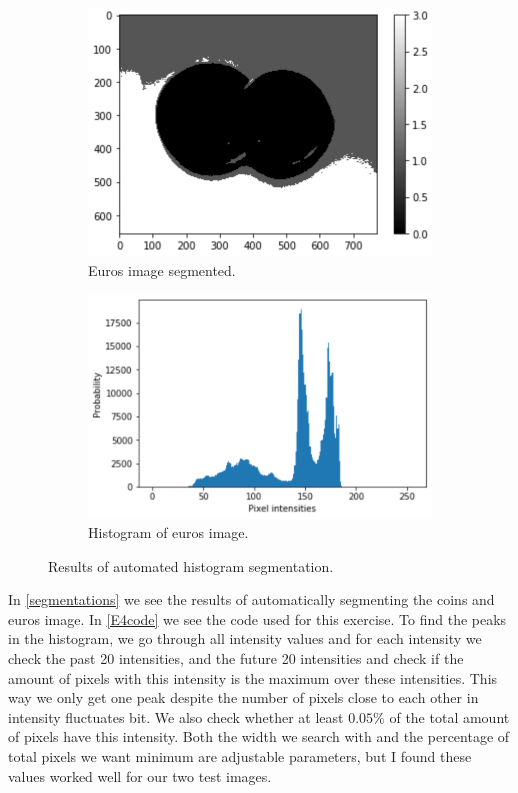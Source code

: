 \begin{figure}[H]
\begin{subfigure}[b]{0.45\linewidth}
		\includegraphics[width=\linewidth]{Materials/E4/euros_seg}
		\caption{Euros image segmented.}
	\end{subfigure}
	\hfill
	\begin{subfigure}[b]{0.45\linewidth}
		\centering
		\includegraphics[width=\linewidth]{Materials/E4/euros_hist}
		\caption{Histogram of euros image.}
	\end{subfigure}
	\caption{Results of automated histogram segmentation.}
	\label{segmentations}
\end{figure}
In \autoref{segmentations} we see the results of automatically segmenting the coins and euros image. In \autoref{E4code} we see the code used for this exercise. To find the peaks in the histogram, we go through all intensity values and for each intensity we check the past 20 intensities, and the future 20 intensities and check if the amount of pixels with this intensity is the maximum over these intensities. This way we only get one peak despite the number of pixels close to each other in intensity fluctuates bit. We also check whether at least $0.05\%$ of the total amount of pixels have this intensity. Both the width we search with and the percentage of total pixels we want minimum are adjustable parameters, but I found these values worked well for our two test images.\\
